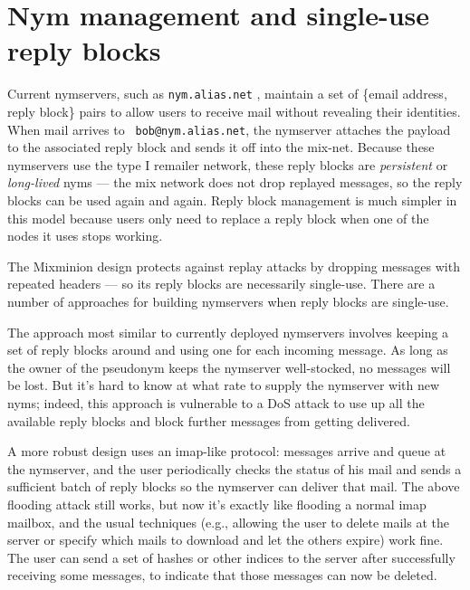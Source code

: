 \documentclass{llncs}
\begin{document}


\section{Nym management and single-use reply blocks}
\label{sec:nymservers}

Current nymservers, such as {\tt nym.alias.net} \cite{nym-alias-net},
maintain a set of \{email address, reply block\} pairs to allow users to
receive mail without revealing their identities. When mail arrives to {\tt
bob@nym.alias.net}, the nymserver attaches the payload to the associated
reply block and sends it off into the mix-net. Because these nymservers
use the type I remailer network, these reply blocks are \emph{persistent}
or \emph{long-lived} nyms --- the mix network does not drop replayed
messages, so the reply blocks can be used again and again. Reply block
management is much simpler in this model because users only need to
replace a reply block when one of the nodes it uses stops working.

The Mixminion design protects against replay attacks by dropping
messages with repeated headers --- so its reply blocks are necessarily
single-use. There are a number of approaches for building nymservers
when reply blocks are single-use.

The approach most similar to currently deployed nymservers involves
keeping a set of reply blocks around and using one for each incoming
message. As long as the owner of the pseudonym keeps the nymserver
well-stocked, no messages will be lost. But it's hard to know at what
rate to supply the nymserver with new nyms; indeed, this approach is
vulnerable to a DoS attack to use up all the available reply blocks and
block further messages from getting delivered.

A more robust design uses an imap-like protocol: messages arrive and queue
at the nymserver, and the user periodically checks the status of his mail
and sends a sufficient batch of reply blocks so the nymserver can deliver
that mail. The above flooding attack still works, but now it's exactly
like flooding a normal imap mailbox, and the usual techniques (e.g.,
allowing the user to delete mails at the server or specify which mails to
download and let the others expire) work fine. The user can send a set
of hashes or other indices to the server after successfully receiving
some messages, to indicate that those messages can now be deleted.
\end{document}
